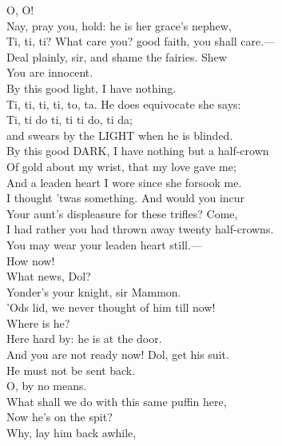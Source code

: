 \documentclass[a4paper,oneside]{memoir}
\begin{document}
\begin{drama*}
\dapperspeaks O, O!\\
\facespeaks {} Nay, pray you, hold: he is her grace's nephew,\\
Ti, ti, ti? What care you? good faith, you shall care.---\\
Deal plainly, sir, and shame the fairies. Shew\\
You are innocent.\\
\dapperspeaks {} By this good light, I have nothing.\\
\subtlespeaks Ti, ti, ti, ti, to, ta. He does equivocate she says:\\
Ti, ti do ti, ti ti do, ti da;\\
and swears by the LIGHT when he is blinded.\\
\dapperspeaks By this good DARK, I have nothing but a half-crown\\
Of gold about my wrist, that my love gave me;\\
And a leaden heart I wore since she forsook me.\\
\facespeaks I thought 'twas something. And would you incur\\
Your aunt's displeasure for these trifles? Come,\\
I had rather you had thrown away twenty half-crowns.\\
You may wear your leaden heart still.---\\
How now!\\
\subtlespeaks {} What news, Dol?\\
\dolspeaks {} Yonder's your knight, sir Mammon.\\
\facespeaks 'Ods lid, we never thought of him till now!\\
Where is he?\\
\dolspeaks {} Here hard by: he is at the door.\\
\subtlespeaks And you are not ready now! Dol, get his suit.\\
He must not be sent back.\\
\facespeaks {} O, by no means.\\
What shall we do with this same puffin here,\\
Now he's on the spit?\\
\subtlespeaks {} Why, lay him back awhile,\\

\end{drama*}
\end{document}
